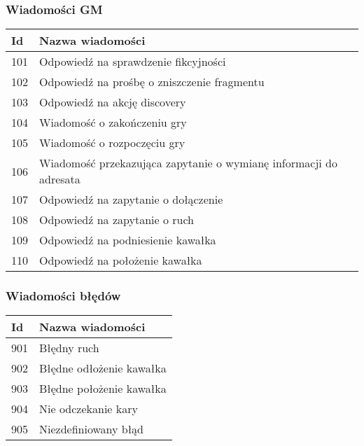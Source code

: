 \documentclass[Dokumentacja.tex]{subfiles}
\begin{document}
\subsubsection{Wiadomości GM}
\begin{tabular}{ |p{1cm}|p{12cm}| } 
 \hline
 Id & Nazwa wiadomości \\
 \hline
 101 & Odpowiedź na sprawdzenie fikcyjności \\
 102 & Odpowiedź na prośbę o zniszczenie fragmentu \\
 103 & Odpowiedź na akcję discovery \\
 104 & Wiadomość o zakończeniu gry \\
 105 & Wiadomość o rozpoczęciu gry \\
 106 & Wiadomość przekazująca zapytanie o wymianę informacji do adresata \\
 107 & Odpowiedź na zapytanie o dołączenie \\
 108 & Odpowiedź na zapytanie o ruch \\
 109 & Odpowiedź na podniesienie kawałka \\
 110 & Odpowiedź na położenie kawałka \\
 \hline
\end{tabular}

\subsubsection{Wiadomości błędów}
\begin{tabular}{ |p{1cm}|p{12cm}| } 
 \hline
 Id & Nazwa wiadomości \\
 \hline
 901 & Błędny ruch \\
 902 & Błędne odłożenie kawałka \\
 903 & Błędne położenie kawałka \\
 904 & Nie odczekanie kary \\
 905 & Niezdefiniowany błąd \\
 \hline
\end{tabular}
\end{document}
